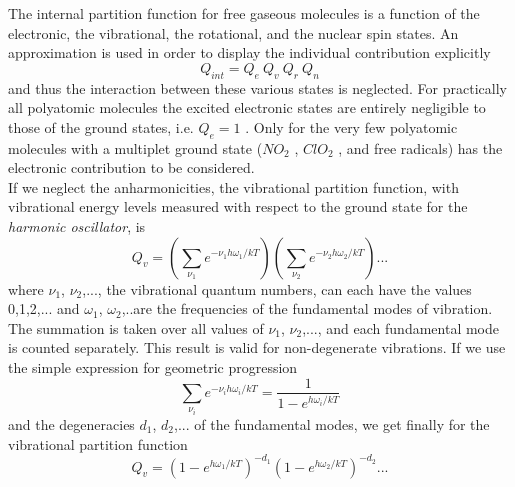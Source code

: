 The internal partition function for free gaseous molecules is  a
function of the electronic, the vibrational, the rotational, and the
nuclear spin states. An approximation is used in order to display the
individual contribution explicitly 
\begin{equation}
 Q_{int}=Q_e~Q_v~Q_r~Q_n
\end{equation}
and thus the interaction between these various states is neglected.
For practically all polyatomic molecules the excited electronic states
are entirely negligible to those of the ground states, i.e. $Q_e=1$ .
Only for the very few polyatomic molecules with a multiplet ground
state ($NO_2$ , $ClO_2$ , and free radicals) has the
electronic contribution to be considered.\\
If we neglect the anharmonicities, the vibrational partition function,
with vibrational energy levels measured with respect to the ground
state for the {\it harmonic oscillator}, is
\begin{equation}
 Q_v=\left(\sum_{\nu_1}e^{-\nu_1 h\omega_1/kT}\right)\left(\sum_{\nu_2}e^{-\nu_2 h\omega_2/kT}\right)...
\end{equation}
where $\nu_1$, $\nu_2$,..., the vibrational quantum numbers, can each
have the values 0,1,2,... and $\omega_1$, $\omega_2$,..are the
frequencies of the fundamental modes of vibration. The summation is
taken over all values of $\nu_1$, $\nu_2$,..., and each fundamental
mode is counted separately. This result is valid for non-degenerate
vibrations. If we use the simple expression for geometric progression
\begin{equation}
 \sum_{\nu_i}e^{-\nu_i h\omega_i/kT}=\frac{1}{1-e^{h\omega_i/kT}}
\end{equation}
and the degeneracies $d_1$, $d_2$,... of the fundamental modes, we get
finally for the vibrational partition function
\begin{equation}
Q_v=\left(1-e^{h\omega_1/kT}\right)^{-d_1}\left(1-e^{h\omega_2/kT}\right)^{-d_2}...
\end{equation}

